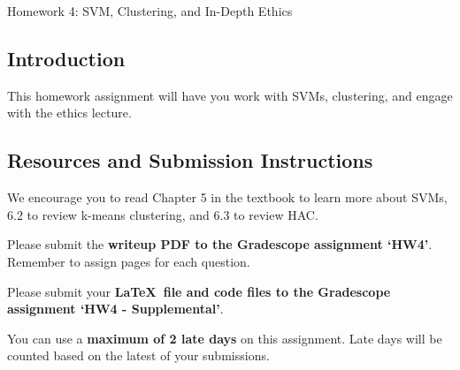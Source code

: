 \documentclass[submit]{harvardml}
\begin{document}
\begin{center}
{\Large Homework 4: SVM, Clustering, and In-Depth Ethics}\\
\end{center}

\subsection*{Introduction}

This homework assignment will have you work with SVMs, clustering, and engage with the ethics lecture.

\subsection*{Resources and Submission Instructions}
We encourage you to
read Chapter 5 in the textbook to learn more about SVMs, 6.2 to review k-means clustering, and 6.3 to review HAC.

Please submit the \textbf{writeup PDF to the Gradescope assignment `HW4'}. Remember to assign pages for each question.

Please submit your \textbf{\LaTeX\ file and code files to the Gradescope assignment `HW4 - Supplemental'}. 

You can use a \textbf{maximum of 2 late days} on this assignment.  Late days will be counted based on the latest of your submissions. 

\newpage
\end{document}
